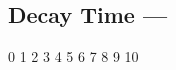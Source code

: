 \subsection[Decay Time]{Decay Time --- \UiKey{\I}\UiKey{\SET}}









































0
1
2
3
4
5
6
7
8
9
10
